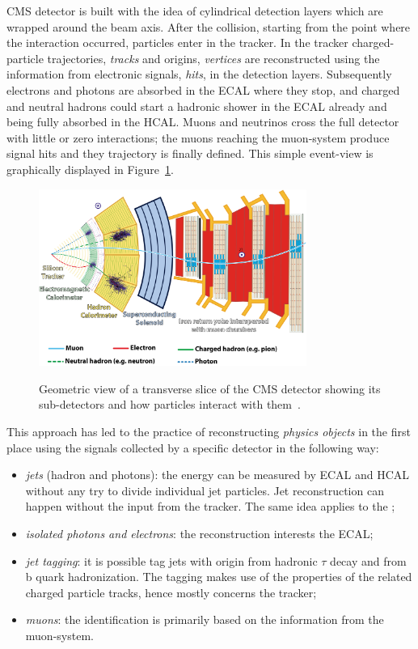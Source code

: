 CMS detector is built with the idea of cylindrical detection layers
which are wrapped around the beam axis. After the collision, starting
from the point where the interaction occurred, particles enter in the
tracker. In the tracker charged-particle trajectories, \emph{tracks}
and origins, \emph{vertices} are reconstructed using the information from
electronic signals, \emph{hits}, in the detection layers. Subsequently
electrons and photons are absorbed in the ECAL where they stop, and
charged and neutral hadrons could start a hadronic shower in the ECAL
already and being fully absorbed in the HCAL. Muons and neutrinos cross
the full detector with little or zero interactions; the muons reaching the muon-system produce
signal hits and they trajectory is finally defined. This simple
event-view is graphically displayed in Figure~\ref{fig:cmsslice}.
\begin{figure}[h]
\centering
\includegraphics[width=0.78\textwidth]{Figures/c2/CMSslice.png}\\
\caption{Geometric view of a transverse slice of the CMS detector showing its sub-detectors and how particles interact with them~\cite{Barney:2120661}.}
\label{fig:cmsslice}
\end{figure} 

This approach has led to the practice of reconstructing \emph{physics
objects} in the first place using the signals collected by a specific
detector in the following way:
\begin{itemize}
\setlength\itemsep{-0.2em}
\item \emph{jets} (hadron and photons): the energy can be measured by ECAL
  and HCAL without any try to divide individual jet particles. Jet
  reconstruction can happen without the input from the tracker. The
  same idea applies to the \ptmiss;
\item \emph{isolated photons and electrons}: the reconstruction interests the
  ECAL;
\item \emph{jet tagging}: it is possible tag jets with origin from hadronic $\tau$ decay and
  from b quark hadronization. The tagging makes use of the properties of
  the related charged particle tracks, hence mostly concerns the
  tracker;
\item \emph{muons}: the identification is primarily based on the information
  from the muon-system.
\end{itemize}

